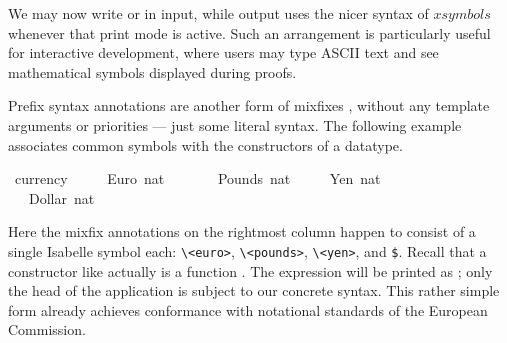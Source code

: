 \begin{isabellebody}
\begin{isamarkuptext}
We may now write  or  in input, while
output uses the nicer syntax of $xsymbols$ whenever that print mode is
active.  Such an arrangement is particularly useful for interactive
development, where users may type ASCII text and see mathematical
symbols displayed during proofs.%
\end{isamarkuptext}%
\isamarkuptrue%
%
\isamarkuptrue%
%
\begin{isamarkuptext}%
Prefix syntax annotations are another form
  of mixfixes \cite{isabelle-ref}, without any template arguments or
  priorities --- just some literal syntax.  The following example
  associates common symbols with the constructors of a datatype.%
\end{isamarkuptext}%
\isamarkuptrue%
\isamarkupfalse%
\ currency\ {}\isanewline
\ \ \ \ Euro\ nat\ \ \ \ {}{}{}{}{}\isanewline
\ \ {}\ Pounds\ nat\ \ {}{}{}{}{}\isanewline
\ \ {}\ Yen\ nat\ \ \ \ \ {}{}{}{}{}\isanewline
\ \ {}\ Dollar\ nat\ \ {}{}{}{}{}%
\begin{isamarkuptext}%
\noindent Here the mixfix annotations on the rightmost column happen
  to consist of a single Isabelle symbol each: \verb,\,\verb,<euro>,,
  \verb,\,\verb,<pounds>,, \verb,\,\verb,<yen>,, and \verb,$,.  Recall
  that a constructor like  actually is a function .  The expression  will be
  printed as ; only the head of the application is
  subject to our concrete syntax.  This rather simple form already
  achieves conformance with notational standards of the European
  Commission.


\end{isamarkuptext}
\end{isabellebody}
